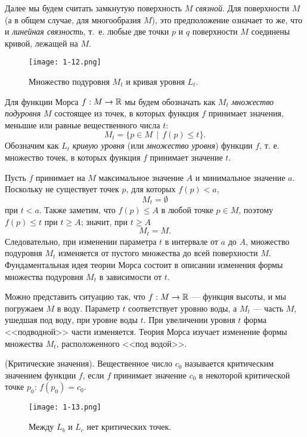 \documentclass[a4paper,12pt,openany,leqno]{extbook}
\begin{document}
Далее мы будем считать замкнутую поверхность $M$ \emph{связной}. Для поверхности $M$ (а в общем случае, для многообразия $M$), это предположение означает то же, что и \emph{линейная связность}, т.~е. любые две точки $p$ и $q$ поверхности $M$ соединены кривой, лежащей на $M$.

\begin{figure}[t]
\texttt{[image: 1-12.png]}
\caption{Множество подуровня $M_t$ и кривая уровня $L_t$.}
\label{fig:sublevel_surface}
\end{figure}

Для функции Морса $f: M \to \mathbb{R}$ мы будем обозначать как $M_t$ \emph{множество подуровня} $M$ состоящее из точек, в которых функция $f$ принимает значения, меньшие или равные вещественного числа $t$:
\begin{equation}
M_t = \{p \in M \,\mid\,f(p)\leq t\}.
\end{equation}
Обозначим как $L_t$ \emph{кривую уровня} (или \emph{множество уровня}) функции $f$, т. е. множество точек, в которых функция $f$ принимает значение $t$.

Пусть $f$ принимает на $M$ максимальное значение $A$ и минимальное значение $a$. Поскольку не существует точек $p$, для которых $f(p) < a$,
\[M_t = \emptyset\]
при $t < a$. Также заметим, что $f(p) \leq A$ в любой точке $p \in M$, поэтому $f(p) \leq t$ при $t \geq A$; значит, при $t \geq A$
\[M_t = M.\]
Следовательно, при изменении параметра $t$ в интервале от $a$ до $A$, множество подуровня $M_t$ изменяется от пустого множества до всей поверхности $M$. Фундаментальная идея теории Морса состоит в описании изменения формы множества подуровня $M_t$ в зависимости от $t$.

Можно представить ситуацию так, что $f: M \to \mathbb{R}$ --- функция высоты, и мы погружаем $M$ в воду. Параметр $t$ соответствует уровню воды, а $M_t$ --- часть $M$, ушедшая под воду, при уровне воды $t$. При увеличении уровня $t$ форма <<подводной>> части изменяется. Теория Морса изучает изменение формы множества $M_t$, расположенного <<под водой>>.

\begin{definition} (Критические значения). Вещественное число $c_0$ называется критическим значением функции $f$, если $f$ принимает значение $c_0$ в некоторой критической точке $p_0$: $f(p_0) = c_0$.
\end{definition}

\begin{figure}[t]
\texttt{[image: 1-13.png]}
\caption{Между $L_b$ и $L_c$ нет критических точек.}
\label{fig:lemma_cylinder}
\end{figure}
\end{document}
